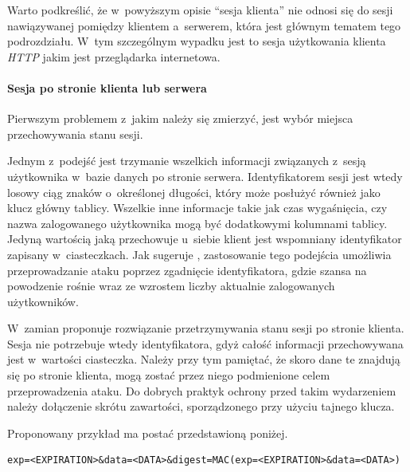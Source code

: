 \documentclass[11pt]{aghdpl}
\begin{document}
Warto podkreślić, że w~powyższym opisie ``sesja klienta'' nie odnosi się do sesji nawiązywanej pomiędzy klientem a~serwerem, która jest głównym tematem tego podrozdziału. W~tym szczególnym wypadku jest to sesja użytkowania klienta \emph{HTTP} jakim jest przeglądarka internetowa.

\paragraph{Sesja po stronie klienta lub serwera}

Pierwszym problemem z~jakim należy się zmierzyć, jest wybór miejsca przechowywania stanu sesji. 

Jednym z~podejść jest trzymanie wszelkich informacji związanych z~sesją użytkownika w~bazie danych po stronie serwera. Identyfikatorem sesji jest wtedy losowy ciąg znaków o~określonej długości, który może posłużyć również jako klucz główny tablicy. Wszelkie inne informacje takie jak czas wygaśnięcia, czy nazwa zalogowanego użytkownika mogą być dodatkowymi kolumnami tablicy. Jedyną wartością jaką przechowuje u~siebie klient jest wspomniany identyfikator zapisany w~ciasteczkach. Jak sugeruje \cite{ClAu}, zastosowanie tego podejścia umożliwia przeprowadzanie ataku poprzez zgadnięcie identyfikatora, gdzie szansa na powodzenie rośnie wraz ze wzrostem liczby aktualnie zalogowanych użytkowników.

W~zamian \cite{ClAu} proponuje rozwiązanie przetrzymywania stanu sesji po stronie klienta. Sesja nie potrzebuje wtedy identyfikatora, gdyż całość informacji przechowywana jest w~wartości ciasteczka. Należy przy tym pamiętać, że skoro dane te znajdują się po stronie klienta, mogą zostać przez niego podmienione celem przeprowadzenia ataku. Do dobrych praktyk ochrony przed takim wydarzeniem należy dołączenie skrótu zawartości, sporządzonego przy użyciu tajnego klucza.

Proponowany przykład ma postać przedstawioną poniżej.
\begin{lstlisting}
exp=<EXPIRATION>&data=<DATA>&digest=MAC(exp=<EXPIRATION>&data=<DATA>)
\end{lstlisting}
\end{document}
